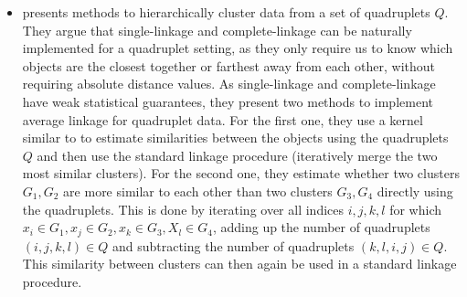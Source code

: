 \begin{itemize}
    \item %
        \cite{ghoshdastidarFoundationsComparisonBasedHierarchical2019} presents methods to hierarchically cluster data from a set of quadruplets $Q$. They argue that single-linkage and complete-linkage can be
        naturally implemented for a quadruplet setting, as they only require us to know which objects are the closest together or farthest away from each other, without requiring
        absolute distance values. As single-linkage and complete-linkage have weak statistical guarantees, they present two methods to implement average linkage for quadruplet data. 
        For the first one, they use a kernel similar to \cite{kleindessnerKernelFunctionsBased2017} to estimate similarities between the objects using the quadruplets $Q$ and then use the standard
        linkage procedure (iteratively merge the two most similar clusters). For the second one, they estimate whether two clusters $G_1, G_2$ are more similar to each other than two clusters $G_3, G_4$ directly using the quadruplets. This is done
        by iterating over all indices $i,j,k,l$ for which $x_i \in G_1, x_j \in G_2, x_k \in G_3, X_l \in G_4$,
        adding up the number of quadruplets $(i,j,k,l) \in Q$ and subtracting the number of quadruplets $(k, l, i, j) \in Q$.         
        This similarity between clusters can then again be used in a standard linkage procedure.
\end{itemize}

